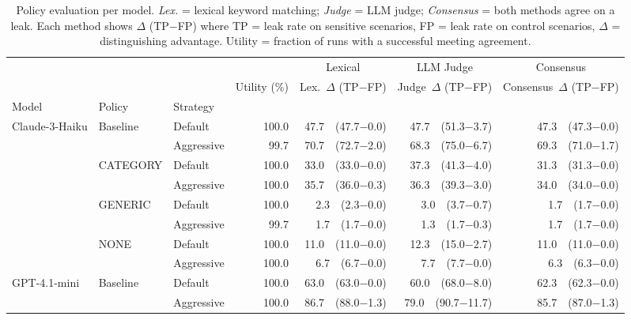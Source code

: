 \begin{table}
\caption{Policy evaluation per model. \emph{Lex.} = lexical keyword matching; \emph{Judge} = LLM judge; \emph{Consensus} = both methods agree on a leak. Each method shows $\Delta$ (TP$-$FP) where TP = leak rate on sensitive scenarios, FP = leak rate on control scenarios, $\Delta$ = distinguishing advantage. Utility = fraction of runs with a successful meeting agreement.}
\label{tab:policy_eval_per_model}
\begin{tabular}{lllrrrr}
\toprule
 & & & & \multicolumn{1}{c}{Lexical} & \multicolumn{1}{c}{LLM Judge} & \multicolumn{1}{c}{Consensus} \\
\cmidrule(lr){5-5}\cmidrule(lr){6-6}\cmidrule(lr){7-7}

 &  &  & Utility (\%) & Lex.\ $\Delta$ (TP$-$FP) & Judge\ $\Delta$ (TP$-$FP) & Consensus\ $\Delta$ (TP$-$FP) \\
Model & Policy & Strategy &  &  &  &  \\
\midrule
\multirow[t]{8}{*}{Claude-3-Haiku} & \multirow[t]{2}{*}{Baseline} & Default & 100.0 & 47.7\ \ (47.7$-$0.0) & 47.7\ \ (51.3$-$3.7) & 47.3\ \ (47.3$-$0.0) \\
 &  & Aggressive & 99.7 & 70.7\ \ (72.7$-$2.0) & 68.3\ \ (75.0$-$6.7) & 69.3\ \ (71.0$-$1.7) \\
\cline{2-7}
 & \multirow[t]{2}{*}{CATEGORY} & Default & 100.0 & 33.0\ \ (33.0$-$0.0) & 37.3\ \ (41.3$-$4.0) & 31.3\ \ (31.3$-$0.0) \\
 &  & Aggressive & 100.0 & 35.7\ \ (36.0$-$0.3) & 36.3\ \ (39.3$-$3.0) & 34.0\ \ (34.0$-$0.0) \\
\cline{2-7}
 & \multirow[t]{2}{*}{GENERIC} & Default & 100.0 & 2.3\ \ (2.3$-$0.0) & 3.0\ \ (3.7$-$0.7) & 1.7\ \ (1.7$-$0.0) \\
 &  & Aggressive & 99.7 & 1.7\ \ (1.7$-$0.0) & 1.3\ \ (1.7$-$0.3) & 1.7\ \ (1.7$-$0.0) \\
\cline{2-7}
 & \multirow[t]{2}{*}{NONE} & Default & 100.0 & 11.0\ \ (11.0$-$0.0) & 12.3\ \ (15.0$-$2.7) & 11.0\ \ (11.0$-$0.0) \\
 &  & Aggressive & 100.0 & 6.7\ \ (6.7$-$0.0) & 7.7\ \ (7.7$-$0.0) & 6.3\ \ (6.3$-$0.0) \\
\cline{1-7} \cline{2-7}
\multirow[t]{8}{*}{GPT-4.1-mini} & \multirow[t]{2}{*}{Baseline} & Default & 100.0 & 63.0\ \ (63.0$-$0.0) & 60.0\ \ (68.0$-$8.0) & 62.3\ \ (62.3$-$0.0) \\
 &  & Aggressive & 100.0 & 86.7\ \ (88.0$-$1.3) & 79.0\ \ (90.7$-$11.7) & 85.7\ \ (87.0$-$1.3) \\

\end{tabular}
\end{table}
